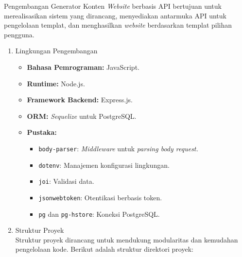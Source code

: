 Pengembangan Generator Konten \textit{Website} berbasis API bertujuan untuk merealisasikan sistem yang dirancang, menyediakan antarmuka API untuk pengelolaan templat, dan menghasilkan \textit{website} berdasarkan templat pilihan pengguna.

\begin{enumerate}[label*=\arabic*.,ref=\arabic*]
    \item Lingkungan Pengembangan
        \begin{itemize}
            \item \textbf{Bahasa Pemrograman:} JavaScript.
            \item \textbf{Runtime:} Node.js.
            \item \textbf{Framework Backend:} Express.js.
            \item \textbf{ORM:} \textit{Sequelize} untuk PostgreSQL.
            \item \textbf{Pustaka:}
                \begin{itemize}
                    \item \texttt{body-parser}: \textit{Middleware} untuk \textit{parsing body request.}
                    \item \texttt{dotenv}: Manajemen konfigurasi lingkungan.
                    \item \texttt{joi}: Validasi data.
                    \item \texttt{jsonwebtoken}: Otentikasi berbasis token.
                    \item \texttt{pg} dan \texttt{pg-hstore}: Koneksi PostgreSQL.
                \end{itemize}
        \end{itemize}
        
    \item Struktur Proyek\\
        Struktur proyek dirancang untuk mendukung modularitas dan kemudahan pengelolaan kode. Berikut adalah struktur direktori proyek:


\end{enumerate}
